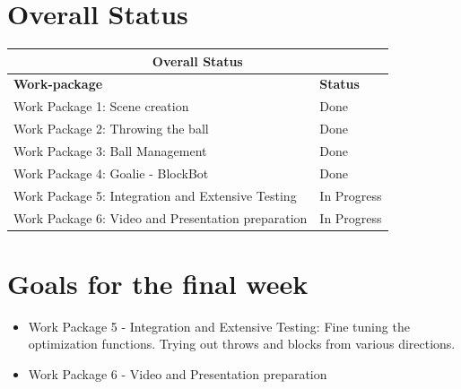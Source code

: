 \documentclass[12pt,pdftex,a4paper]{article}
\begin{document}
\section*{Overall Status}
\begin{tabular}{ |p{10cm}||p{6cm}| }
 \hline
 \multicolumn{2}{|c|}{ \textbf{Overall Status}} \\
 \hline
\textbf{Work-package} & \textbf{Status} \\
 \hline
 Work Package 1: Scene creation                     & Done\\
 Work Package 2: Throwing the ball                  & Done\\
 Work Package 3: Ball Management                    & Done\\
 Work Package 4: Goalie - BlockBot                  & Done\\
 Work Package 5: Integration and Extensive Testing  & In Progress\\
 Work Package 6: Video and Presentation preparation & In Progress\\
 \hline
\end{tabular}

\section*{Goals for the final week}
\begin{itemize}
\item
Work Package 5 - Integration and Extensive Testing:
Fine tuning the optimization functions. Trying out throws and blocks from various directions.
\item
Work Package 6 - Video and Presentation preparation\end{itemize}

\end{document}
